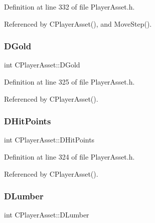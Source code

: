 Definition at line 332 of file Player\+Asset.\+h.



Referenced by C\+Player\+Asset(), and Move\+Step().

\hypertarget{classCPlayerAsset_ab90ebdc73c6794fd44ddbe273f610292}{}\label{classCPlayerAsset_ab90ebdc73c6794fd44ddbe273f610292} 
\subsubsection{\texorpdfstring{D\+Gold}{DGold}}
{\footnotesize\ttfamily int C\+Player\+Asset\+::\+D\+Gold\hspace{0.3cm}{\ttfamily [protected]}}



Definition at line 325 of file Player\+Asset.\+h.



Referenced by C\+Player\+Asset().

\hypertarget{classCPlayerAsset_a331750935bf594e665544085fb74e89d}{}\label{classCPlayerAsset_a331750935bf594e665544085fb74e89d} 
\subsubsection{\texorpdfstring{D\+Hit\+Points}{DHitPoints}}
{\footnotesize\ttfamily int C\+Player\+Asset\+::\+D\+Hit\+Points\hspace{0.3cm}{\ttfamily [protected]}}



Definition at line 324 of file Player\+Asset.\+h.



Referenced by C\+Player\+Asset().

\hypertarget{classCPlayerAsset_af726ea7df9596f02cdb1428d61186349}{}\label{classCPlayerAsset_af726ea7df9596f02cdb1428d61186349} 
\subsubsection{\texorpdfstring{D\+Lumber}{DLumber}}
{\footnotesize\ttfamily int C\+Player\+Asset\+::\+D\+Lumber\hspace{0.3cm}{\ttfamily [protected]}}



